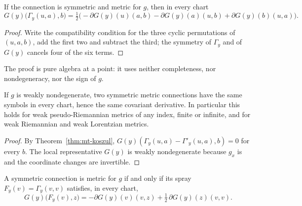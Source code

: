 \begin{theorem}
  \label{thm:mt-koszul}
  \leanok
  If the connection is symmetric and metric for $g$, then in every chart
  \[
    G(y)\bigl(\Gamma_y(u, a), b\bigr) = \tfrac12 \bigl(-\partial G(y)(u)(a, b) - \partial G(y)(a)(u, b)
      + \partial G(y)(b)(u, a)\bigr).
  \]
\end{theorem}

\begin{proof}
  \leanok
  Write the compatibility condition for the three cyclic permutations of $(u, a, b)$, add the first
  two and subtract the third; the symmetry of $\Gamma_y$ and of $G(y)$ cancels four of the six
  terms.
\end{proof}

The proof is pure algebra at a point: it uses neither completeness, nor nondegeneracy, nor the
sign of $g$.

\begin{theorem}
  \label{thm:mt-lc-unique}
  \leanok
  If $g$ is weakly nondegenerate, two symmetric metric connections have the same symbols in every
  chart, hence the same covariant derivative. In particular this holds for weak pseudo-Riemannian
  metrics of any index, finite or infinite, and for weak Riemannian and weak Lorentzian metrics.
\end{theorem}

\begin{proof}
  \leanok
  By Theorem~\ref{thm:mt-koszul}, $G(y)(\Gamma_y(u, a) - \Gamma'_y(u, a), b) = 0$ for every $b$.
  The local representative $G(y)$ is weakly nondegenerate because $g_x$ is and the coordinate
  changes are invertible.
\end{proof}

\begin{theorem}
  \label{thm:mt-metric-spray}
  \leanok
  A symmetric connection is metric for $g$ if and only if its spray $F_y(v) = \Gamma_y(v, v)$
  satisfies, in every chart,
  \[
    G(y)\bigl(F_y(v), z\bigr) = -\partial G(y)(v)(v, z) + \tfrac12\, \partial G(y)(z)(v, v).
  \]
\end{theorem}


